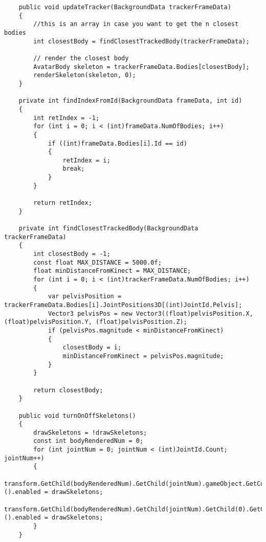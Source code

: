\begin{verbatim}
    public void updateTracker(BackgroundData trackerFrameData)
    {
        //this is an array in case you want to get the n closest bodies
        int closestBody = findClosestTrackedBody(trackerFrameData);

        // render the closest body
        AvatarBody skeleton = trackerFrameData.Bodies[closestBody];
        renderSkeleton(skeleton, 0);
    }

    private int findIndexFromId(BackgroundData frameData, int id)
    {
        int retIndex = -1;
        for (int i = 0; i < (int)frameData.NumOfBodies; i++)
        {
            if ((int)frameData.Bodies[i].Id == id)
            {
                retIndex = i;
                break;
            }
        }

        return retIndex;
    }

    private int findClosestTrackedBody(BackgroundData trackerFrameData)
    {
        int closestBody = -1;
        const float MAX_DISTANCE = 5000.0f;
        float minDistanceFromKinect = MAX_DISTANCE;
        for (int i = 0; i < (int)trackerFrameData.NumOfBodies; i++)
        {
            var pelvisPosition = trackerFrameData.Bodies[i].JointPositions3D[(int)JointId.Pelvis];
            Vector3 pelvisPos = new Vector3((float)pelvisPosition.X, (float)pelvisPosition.Y, (float)pelvisPosition.Z);
            if (pelvisPos.magnitude < minDistanceFromKinect)
            {
                closestBody = i;
                minDistanceFromKinect = pelvisPos.magnitude;
            }
        }

        return closestBody;
    }

    public void turnOnOffSkeletons()
    {
        drawSkeletons = !drawSkeletons;
        const int bodyRenderedNum = 0;
        for (int jointNum = 0; jointNum < (int)JointId.Count; jointNum++)
        {
            transform.GetChild(bodyRenderedNum).GetChild(jointNum).gameObject.GetComponent<MeshRenderer>().enabled = drawSkeletons;
            transform.GetChild(bodyRenderedNum).GetChild(jointNum).GetChild(0).GetComponent<MeshRenderer>().enabled = drawSkeletons;
        }
    }


\end{verbatim}
